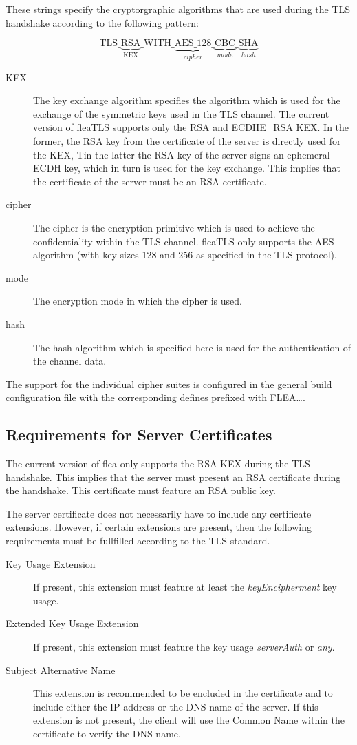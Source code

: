 \documentclass[a4paper,11pt]{scrartcl}
\begin{document}
These strings specify the cryptorgraphic algorithms that are used during the TLS
handshake according to the following pattern:

$$
\mathrm{TLS\_}\underbrace{\mathrm{RSA}}_{\mathrm{KEX}}\mathrm{\_WITH\_}\underbrace{\mathrm{AES\_128}}_{cipher}\_\underbrace{\mathrm{CBC}}_{mode
}\_\underbrace{\mathrm{SHA}}_{hash }
$$
\begin{description}
  \item[KEX] The key exchange algorithm specifies the algorithm which is used
    for the exchange of the symmetric keys used in the TLS channel. The current
    version of fleaTLS supports only the RSA and ECDHE\_RSA KEX. In the former,
    the RSA key from the certificate of the server is directly used for the KEX,
    Tin the latter the RSA key of the server signs an ephemeral ECDH key, which
    in turn is used for the key exchange. This implies that the
    certificate of the server must be an RSA certificate.
  \item[cipher] The cipher is the encryption primitive which is used to achieve
    the confidentiality within the TLS channel. fleaTLS only supports the AES
    algorithm (with key sizes 128 and 256 as specified in the TLS protocol).
  \item [mode] The encryption mode in which the cipher is used. 
  \item[hash] The hash algorithm which is specified here is used for the
    authentication of the channel data.
  \end{description}
The support for the individual cipher suites is configured in the general build
configuration file with the corresponding defines prefixed with FLEA\ldots .


\subsection{Requirements for Server Certificates}

The current version of flea only supports the RSA KEX during the TLS handshake.
This implies that the server must present an RSA certificate during the
handshake. This certificate must feature an RSA public key.

The server certificate does not necessarily have to include any certificate
extensions. However, if certain extensions are present, then the following
requirements must be fullfilled according to the TLS standard.
\begin{description}
  \item [Key Usage Extension] If present, this extension must feature at least
    the \emph{keyEncipherment} key usage.
  \item [Extended Key Usage Extension] If present, this extension must feature
    the key usage \emph{serverAuth} or \emph{any}.
  \item [Subject Alternative Name] This extension is recommended to be encluded
    in the certificate and to include either the IP address or the DNS name of
    the server. If this extension is not present, the client will use the Common
Name within the certificate to verify the DNS name.
\end{description}
\end{document}
